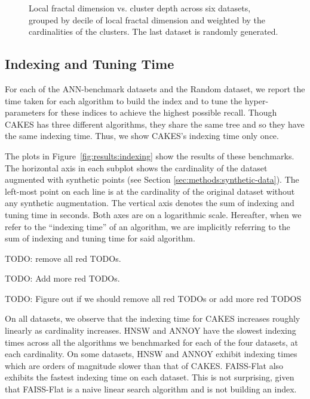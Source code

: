 \begin{figure}
\begin{subfigure}[b]{0.47\textwidth}
        \label{fig:results:random-lfd}
    \end{subfigure}
    \vspace{1em}
    \caption{Local fractal dimension vs. cluster depth across six datasets, grouped by decile of local fractal dimension and weighted by the cardinalities of the clusters.
    The last dataset is randomly generated.}
    \label{fig:results:lfd-plots}
\end{figure}


\subsection{Indexing and Tuning Time}
\label{sec:results:indexing-and-tuning-time}

For each of the ANN-benchmark datasets and the Random dataset, we report the time taken for each algorithm to build the index and to tune the hyper-parameters for these indices to achieve the highest possible recall.
Though CAKES has three different algorithms, they share the same tree and so they have the same indexing time.
Thus, we show CAKES's indexing time only once.

The plots in Figure~\ref{fig:results:indexing} show the results of these benchmarks.
The horizontal axis in each subplot shows the cardinality of the dataset augmented with synthetic points (see Section \ref{sec:methods:synthetic-data}).
The left-most point on each line is at the cardinality of the original dataset without any synthetic augmentation.
The vertical axis denotes the sum of indexing and tuning time in seconds.
Both axes are on a logarithmic scale.
Hereafter, when we refer to the ``indexing time'' of an algorithm, we are implicitly referring to the sum of indexing and tuning time for said algorithm.

{\color{red} TODO: remove all red TODOs.}

{\color{red} TODO: Add more red TODOs.}

{\color{red} TODO: Figure out if we should remove all red TODOs or add more red TODOS}

On all datasets, we observe that the indexing time for CAKES increases roughly linearly as cardinality increases.
HNSW and ANNOY have the slowest indexing times across all the algorithms we benchmarked for each of the four datasets, at each cardinality. 
On some datasets, HNSW and ANNOY exhibit indexing times which are orders of magnitude slower than that of CAKES.
FAISS-Flat also exhibits the fastest indexing time on each dataset. 
This is not surprising, given that FAISS-Flat is a naive linear search algorithm and is not building an index.

